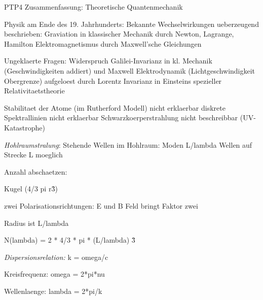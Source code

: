 \documentclass{article}
\begin{document}
\begin{center}
\large
PTP4 Zusammenfassung: Theoretische Quantenmechanik
\end{center}


Physik am Ende des 19. Jahrhunderts: 
Bekannte Wechselwirkungen ueberzeugend beschrieben: 
Graviation in klassischer Mechanik durch Newton, Lagrange, Hamilton
Elektromagnetismus durch Maxwell'sche Gleichungen

Ungeklaerte Fragen: 
Widerspruch Galilei-Invarianz in kl. Mechanik (Geschwindigkeiten addiert) und Maxwell Elektrodynamik (Lichtgeschwindigkeit Obergrenze) aufgeloest durch Lorentz Invarianz in Einsteins spezieller Relativitaetstheorie

Stabilitaet der Atome (im Rutherford Modell) nicht erklaerbar
diskrete Spektrallinien nicht erklaerbar
Schwarzkoerperstrahlung nicht beschreibbar (UV-Katastrophe)

\emph{Hohlraumstralung}: 
Stehende Wellen im Hohlraum: Moden
L/lambda Wellen auf Strecke L moeglich


Anzahl abschaetzen:


Kugel (4/3 pi r\^3)


zwei Polarisationsrichtungen: E und B Feld bringt Faktor zwei


Radius ist L/lambda 


N(lambda)  = 2 * 4/3 * pi * (L/lambda) \^3


\emph{Dispersionsrelation:} k = omega/c


Kreisfrequenz: omega = 2*pi*nu


Wellenlaenge: lambda = 2*pi/k
\end{document}
